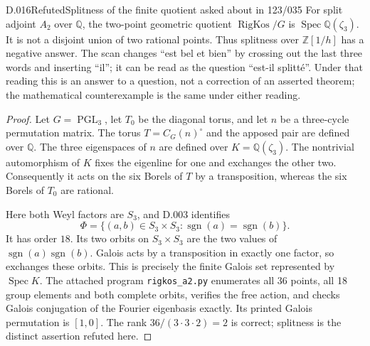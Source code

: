 \begin{saresult}{D.016}{Refuted}{Splitness of the finite quotient asked about in 123/035}
For split adjoint $A_2$ over $\mathbb Q$, the two-point geometric
quotient $\operatorname{RigKos}/G$ is
$\operatorname{Spec}\mathbb Q(\zeta_3)$.  It is not a disjoint
union of two rational points.  Thus splitness over
$\mathbb Z[1/h]$ has a negative answer.  The scan changes
``est bel et bien'' by crossing out the last three words
and inserting ``il''; it can be read as the question
``est-il splitt\'e''.  Under that reading this is an answer
to a question, not a correction of an asserted theorem;
the mathematical counterexample is the same under either reading.
\end{saresult}
\begin{proof}
Let $G=\operatorname{PGL}_3$, let $T_0$ be the diagonal torus, and
let $n$ be a three-cycle permutation matrix.  The torus
$T=C_G(n)^\circ$ and the apposed pair are defined over $\mathbb Q$.
The three eigenspaces of $n$ are defined over
$K=\mathbb Q(\zeta_3)$.  The nontrivial automorphism of $K$ fixes
the eigenline for one and exchanges the other two.  Consequently
it acts on the six Borels of $T$ by a transposition, whereas the
six Borels of $T_0$ are rational.

Here both Weyl factors are $S_3$, and D.003 identifies
\[
\Phi=\{(a,b)\in S_3\times S_3:
                    \operatorname{sgn}(a)=\operatorname{sgn}(b)\}.
\]
It has order $18$.  Its two orbits on $S_3\times S_3$ are the
two values of $\operatorname{sgn}(a)\operatorname{sgn}(b)$.
Galois acts by a transposition in exactly one factor, so exchanges
these orbits.  This is precisely the finite Galois set represented
by $\operatorname{Spec}K$.  The attached program
\texttt{rigkos\_a2.py} enumerates all 36 points, all 18 group
elements and both complete orbits, verifies the free action, and
checks Galois conjugation of the Fourier eigenbasis exactly.
Its printed Galois permutation is $[1,0]$.
The rank $36/(3\cdot3\cdot2)=2$ is correct; splitness is the
distinct assertion refuted here.
\end{proof}

